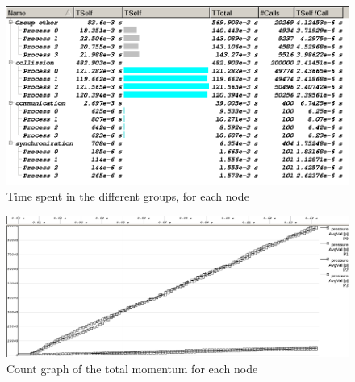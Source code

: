 \documentclass[a4paper]{article}
\begin{document}
\begin{figure}[H]
  \centering
  \includegraphics[scale=0.5]{group_times.png}
  \caption{Time spent in the different groups, for each node}
  \label{time}
\end{figure}

\begin{figure}[H]
  \centering
  \includegraphics[scale=0.3]{count.png}
  \caption{Count graph of the total momentum for each node}
  \label{count}
\end{figure}
\end{document}
